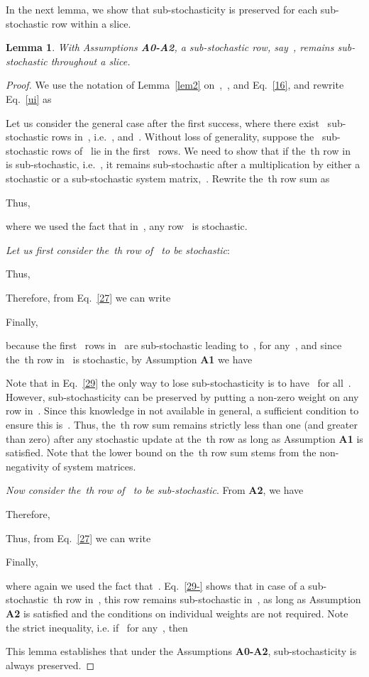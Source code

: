 \documentclass[draftclsnofoot, onecolumn, 12pt]{IEEEtran}
\newtheorem{lem}{Lemma}
\begin{document}
In the next lemma, we show that sub-stochasticity is preserved for each sub-stochastic row within a slice.
\begin{lem}\label{lem3}
With Assumptions {\bf{A0-A2}}, a sub-stochastic row, say~, remains sub-stochastic throughout a slice.
\end{lem} 
\begin{proof}
We use the notation of Lemma~\ref{lem2} on~,~, and Eq.~\eqref{16}, and rewrite Eq.~\eqref{ui} as

Let us consider the general case after the first success, where there exist~ sub-stochastic rows in~, i.e.~, and~. Without loss of generality, suppose the~ sub-stochastic rows of~ lie in the first~ rows. We need to show that if the~th row in~ is sub-stochastic, i.e.~, it remains sub-stochastic after a multiplication by either a stochastic or a sub-stochastic system matrix,~. Rewrite the~th row sum as

Thus,

where we used the fact that in~, any row~ is stochastic. 

\emph{Let us first consider the~th row of~ to be stochastic}:

Thus,

Therefore, from Eq.~\eqref{27} we can write

Finally,

because the first~ rows in~ are sub-stochastic leading to~, for any~, and since the~th row in~ is stochastic, by Assumption {\bf{A1}} we have

Note that in Eq.~\eqref{29} the only way to lose sub-stochasticity is to have~ for all~. However, sub-stochasticity can be preserved by putting a non-zero weight on any row in~. Since this knowledge in not available in general, a sufficient condition to ensure this is~. Thus, the~th row sum remains strictly less than one (and greater than zero) after any stochastic update at the~th row as long as Assumption {\bf{A1}} is satisfied. Note that the lower bound on the~th row sum stems from the non-negativity of system matrices. 

\emph{Now consider the~th row of~ to be sub-stochastic}. From {\bf{A2}}, we have

Therefore,

Thus, from Eq.~\eqref{27} we can write

Finally,

where again we used the fact that~. Eq.~\eqref{29-} shows that in case of a sub-stochastic~th row in~, this row remains sub-stochastic in~, as long as Assumption {\bf{A2}} is satisfied and the conditions on individual weights are not required. Note the strict inequality, i.e. if~ for any~, then

This lemma establishes that under the Assumptions {\bf A0-A2}, sub-stochasticity is always preserved.
\end{proof} 
\end{document}
